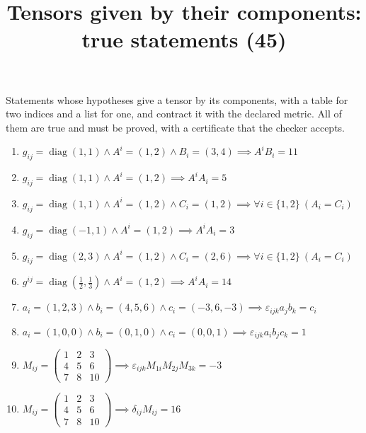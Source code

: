 \documentclass[11pt,a4paper]{article}
\title{Tensors given by their components: true statements (45)}
\author{}
\date{}
\begin{document}
\maketitle
Statements whose hypotheses give a tensor by its components, with a table for two indices and a list for one, and contract it with the declared metric. All of them are true and must be proved, with a certificate that the checker accepts.

\begin{enumerate}
\item $\displaystyle g_{ij} = \operatorname{diag}(1, 1) \land A^{i} = (1, 2) \land B_{i} = (3, 4) \implies A^{i} B_{i} = 11$
\item $\displaystyle g_{ij} = \operatorname{diag}(1, 1) \land A^{i} = (1, 2) \implies A^{i} A_{i} = 5$
\item $\displaystyle g_{ij} = \operatorname{diag}(1, 1) \land A^{i} = (1, 2) \land C_{i} = (1, 2) \implies \forall i \in \{1, 2\}\ \left( A_{i} = C_{i} \right)$
\item $\displaystyle g_{ij} = \operatorname{diag}(-1, 1) \land A^{i} = (1, 2) \implies A^{i} A_{i} = 3$
\item $\displaystyle g_{ij} = \operatorname{diag}(2, 3) \land A^{i} = (1, 2) \land C_{i} = (2, 6) \implies \forall i \in \{1, 2\}\ \left( A_{i} = C_{i} \right)$
\item $\displaystyle g^{ij} = \operatorname{diag}(\frac{1}{2}, \frac{1}{3}) \land A^{i} = (1, 2) \implies A^{i} A_{i} = 14$
\item $\displaystyle a_{i} = (1, 2, 3) \land b_{i} = (4, 5, 6) \land c_{i} = (-3, 6, -3) \implies \varepsilon_{ijk} a_{j} b_{k} = c_{i}$
\item $\displaystyle a_{i} = (1, 0, 0) \land b_{i} = (0, 1, 0) \land c_{i} = (0, 0, 1) \implies \varepsilon_{ijk} a_{i} b_{j} c_{k} = 1$
\item $\displaystyle M_{ij} = \begin{pmatrix} 1 & 2 & 3 \\ 4 & 5 & 6 \\ 7 & 8 & 10 \end{pmatrix} \implies \varepsilon_{ijk} M_{1i} M_{2j} M_{3k} = -3$
\item $\displaystyle M_{ij} = \begin{pmatrix} 1 & 2 & 3 \\ 4 & 5 & 6 \\ 7 & 8 & 10 \end{pmatrix} \implies \delta_{ij} M_{ij} = 16$

\end{enumerate}
\end{document}
